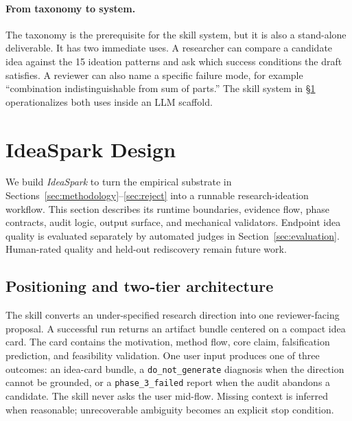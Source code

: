 \documentclass[10pt,a4paper]{article}
\begin{document}
\paragraph{From taxonomy to system.} The taxonomy is the prerequisite for the skill system, but it is also a stand-alone deliverable. It has two immediate uses. A researcher can compare a candidate idea against the 15 ideation patterns and ask which success conditions the draft satisfies. A reviewer can also name a specific failure mode, for example ``combination indistinguishable from sum of parts.'' The skill system in \S\ref{sec:skill} operationalizes both uses inside an LLM scaffold.


\section{IdeaSpark Design}
\label{sec:skill}

We build \emph{IdeaSpark} to turn the empirical substrate in Sections~\ref{sec:methodology}--\ref{sec:reject} into a runnable research-ideation workflow. This section describes its runtime boundaries, evidence flow, phase contracts, audit logic, output surface, and mechanical validators. Endpoint idea quality is evaluated separately by automated judges in Section~\ref{sec:evaluation}. Human-rated quality and held-out rediscovery remain future work.

\subsection{Positioning and two-tier architecture}
\label{subsec:skill-positioning}

The skill converts an under-specified research direction into one reviewer-facing proposal. A successful run returns an artifact bundle centered on a compact idea card. The card contains the motivation, method flow, core claim, falsification prediction, and feasibility validation. One user input produces one of three outcomes: an idea-card bundle, a \texttt{do\_not\_generate} diagnosis when the direction cannot be grounded, or a \texttt{phase\_3\_failed} report when the audit abandons a candidate. The skill never asks the user mid-flow. Missing context is inferred when reasonable; unrecoverable ambiguity becomes an explicit stop condition.
\end{document}
